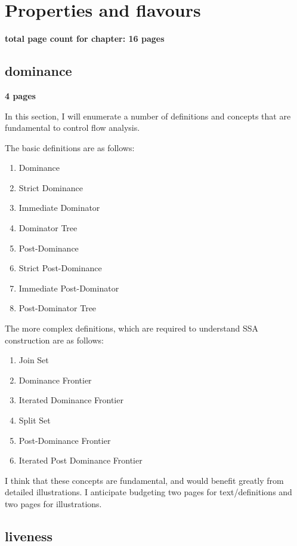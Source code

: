 \chapter{Properties and flavours }

\textbf{total page count for chapter: 16 pages}

\section{dominance}

\textbf{4 pages}

In this section, I will enumerate a number of
definitions and concepts that are fundamental
to control flow analysis.

The basic definitions are as follows:

\begin{enumerate}
\item Dominance
\item Strict Dominance
\item Immediate Dominator
\item Dominator Tree
\item Post-Dominance
\item Strict Post-Dominance
\item Immediate Post-Dominator
\item Post-Dominator Tree
\end{enumerate}

The more complex definitions, which are
required to understand SSA construction are
as follows:

\begin{enumerate}
\item Join Set
\item Dominance Frontier
\item Iterated Dominance Frontier
\item Split Set
\item Post-Dominance Frontier
\item Iterated Post Dominance Frontier
\end{enumerate}

I think that these concepts are fundamental,
and would benefit greatly from detailed
illustrations. I anticipate budgeting
two pages for text/definitions and two
pages for illustrations. 

\section{liveness}


